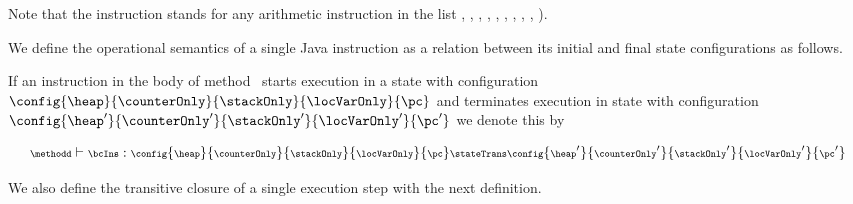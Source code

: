 Note that the instruction \arithOp{} stands for any arithmetic instruction in the list  , , , 
 , ,  , , , ,  ).
 


 


 We define the operational semantics of a single Java instruction  as a 
 relation between its initial and final state configurations as follows. 


 \begin{StateTransition} \label{stateTrans} 
 If an instruction \bcIns in the body of method \methodd \ starts execution in a state with configuration  
 $\config{ \heap}{\counterOnly}{\stackOnly}{\locVarOnly}{ \pc}$ 
 and terminates execution in state with configuration  $\config{ \heap'}{\counterOnly'}{\stackOnly'}{\locVarOnly'}{\pc'}$ we denote this by

  $$  {\scriptsize \methodd \vdash \bcIns : \config{ \heap}{\counterOnly}{\stackOnly}{\locVarOnly}{ \pc }   \stateTrans \config{ \heap'}{\counterOnly'}{\stackOnly'}{\locVarOnly'}{\pc'} } $$
 \end{StateTransition}

 We also define the transitive closure of a single execution step with the next definition.
 

